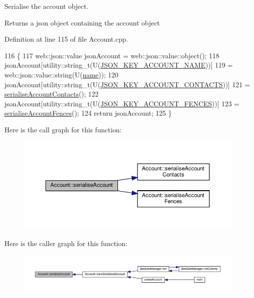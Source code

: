 Serialise the account object.

\begin{DoxyReturn}{Returns}
a json object containing the account object 
\end{DoxyReturn}


Definition at line 115 of file Account.\+cpp.


\begin{DoxyCode}
116 \{
117     web::json::value jsonAccount = web::json::value::object();
118     jsonAccount[utility::string\_t(U(\hyperlink{_account_8h_ac2f820be22c4390a71ec34abe54694c5}{JSON\_KEY\_ACCOUNT\_NAME}))]
119             = web::json::value::string(U(\hyperlink{class_account_a586e2c3461c5231eacf7c96851024a75}{name}));
120     jsonAccount[utility::string\_t(U(\hyperlink{_account_8h_a9a5dc301a4b04c85ce3b865530cd6ca7}{JSON\_KEY\_ACCOUNT\_CONTACTS}))]
121             = \hyperlink{class_account_a7f2d9836817ee851f723f6d3b1ff74a5}{serialiseAccountContacts}();
122     jsonAccount[utility::string\_t(U(\hyperlink{_account_8h_a83ba8a12dba5582a5a125d3ced877c6e}{JSON\_KEY\_ACCOUNT\_FENCES}))]
123             = \hyperlink{class_account_a426837a406852a6e6b11eda85828fc58}{serialiseAccountFences}();
124     \textcolor{keywordflow}{return} jsonAccount;
125 \}
\end{DoxyCode}
Here is the call graph for this function\+:
\nopagebreak
\begin{figure}[H]
\begin{center}
\leavevmode
\includegraphics[width=350pt]{db/d22/class_account_a1e9b184e8a6ddf67e8814e6c575f657e_cgraph}
\end{center}
\end{figure}
Here is the caller graph for this function\+:
\nopagebreak
\begin{figure}[H]
\begin{center}
\leavevmode
\includegraphics[width=350pt]{db/d22/class_account_a1e9b184e8a6ddf67e8814e6c575f657e_icgraph}
\end{center}
\end{figure}
\mbox{\label{class_account_a7f2d9836817ee851f723f6d3b1ff74a5}} 
